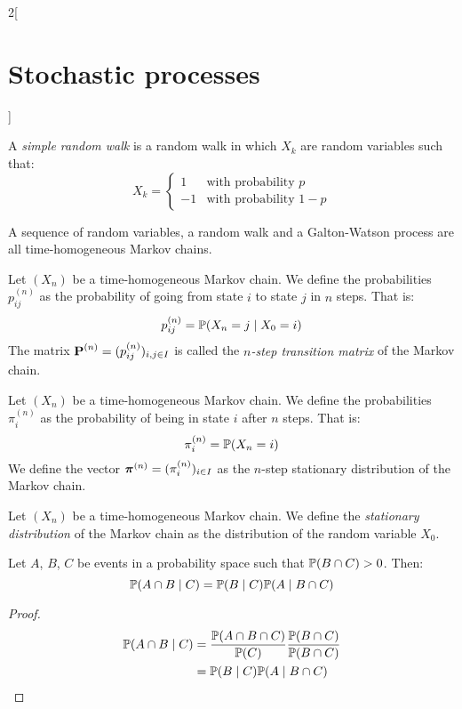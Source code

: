 \documentclass[../../../main_math.tex]{subfiles}
\begin{document}
\begin{multicols}{2}[\section{Stochastic processes}]
  \begin{definition}
    A \emph{simple random walk} is a random walk in which $X_k$ are random variables such that:
    $$
      X_k=\begin{cases}
        1  & \text{with probability $p$}   \\
        -1 & \text{with probability $1-p$}
      \end{cases}
    $$
  \end{definition}
  \begin{lemma}
    A sequence of \iid random variables, a random walk and a Galton-Watson process are all time-homogeneous Markov chains.
  \end{lemma}
  \begin{definition}
    Let $(X_n)$ be a time-homogeneous Markov chain. We define the probabilities $p_{ij}^{(n)}$ as the probability of going from state $i$ to state $j$ in $n$ steps. That is: $$p_{ij}^{(n)}=\mathbb{P}(X_{n}=j\mid X_0=i)$$ The matrix $\boldsymbol{\mathrm{P}}^{(n)}=(p_{ij}^{(n)})_{i,j\in I}$ is called the \emph{$n$-step transition matrix} of the Markov chain.
  \end{definition}
  \begin{definition}
    Let $(X_n)$ be a time-homogeneous Markov chain. We define the probabilities $\pi_i^{(n)}$ as the probability of being in state $i$ after $n$ steps. That is: $$\pi_i^{(n)}=\mathbb{P}(X_n=i)$$
    We define the vector $\boldsymbol{\mathrm{\pi}}^{(n)}=(\pi_i^{(n)})_{i\in I}$ as the $n$-step stationary distribution of the Markov chain.
  \end{definition}
  \begin{definition}
    Let $(X_n)$ be a time-homogeneous Markov chain. We define the \emph{stationary distribution} of the Markov chain as the distribution of the random variable $X_0$.
  \end{definition}
  \begin{lemma}\label{SP:lema1Markov}
    Let $A$, $B$, $C$ be events in a probability space such that $\mathbb{P}(B\cap C)>0$. Then:
    $$\mathbb{P}(A\cap B\mid C)=\mathbb{P}(B\mid C)\mathbb{P}(A\mid B\cap C)$$
  \end{lemma}
  \begin{proof}
    \begin{align*}
      \mathbb{P}(A\cap B\mid C) & =\frac{\mathbb{P}(A\cap B\cap C)}{\mathbb{P}(C)}\frac{\mathbb{P}(B\cap C)}{\mathbb{P}(B\cap C)} \\
                           & =\mathbb{P}(B\mid C)\mathbb{P}(A\mid B\cap C)
    \end{align*}
  \end{proof}

\end{multicols}
\end{document}
